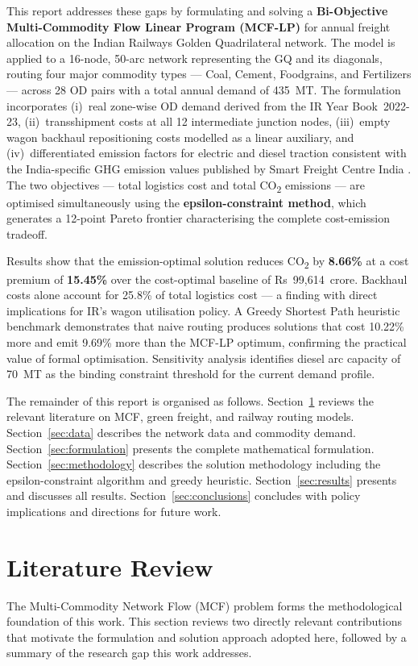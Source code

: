 \documentclass[11pt, a4paper]{article}
\numberwithin{equation}{section}
\numberwithin{figure}{section}
\numberwithin{table}{section}
\begin{document}
This report addresses these gaps by formulating and solving a \textbf{Bi-Objective
Multi-Commodity Flow Linear Program (MCF-LP)} for annual freight allocation on the
Indian Railways Golden Quadrilateral network. The model is applied to a 16-node,
50-arc network representing the GQ and its diagonals, routing four major commodity
types — Coal, Cement, Foodgrains, and Fertilizers — across 28 OD pairs with a total
annual demand of 435~MT. The formulation incorporates (i)~real zone-wise OD demand
derived from the IR Year Book~2022-23, (ii)~transshipment costs at all 12 intermediate
junction nodes, (iii)~empty wagon backhaul repositioning costs modelled as a linear
auxiliary, and (iv)~differentiated emission factors for electric and diesel traction
consistent with the India-specific GHG emission values published by Smart Freight Centre
India \cite{sfcindia2025}. The two objectives — total logistics cost and total
CO\textsubscript{2} emissions — are optimised simultaneously using the
\textbf{epsilon-constraint method}, which generates a 12-point Pareto frontier
characterising the complete cost-emission tradeoff.

Results show that the emission-optimal solution reduces CO\textsubscript{2} by
\textbf{8.66\%} at a cost premium of \textbf{15.45\%} over the cost-optimal baseline of
Rs~99,614~crore. Backhaul costs alone account for 25.8\% of total logistics cost — a
finding with direct implications for IR's wagon utilisation policy. A Greedy Shortest
Path heuristic benchmark demonstrates that naive routing produces solutions that cost 10.22\% more and emit
9.69\% more than the MCF-LP optimum, confirming the practical value of formal
optimisation. Sensitivity analysis identifies diesel arc capacity of 70~MT as the binding constraint threshold for the current demand profile.

The remainder of this report is organised as follows. Section~\ref{sec:litrev} reviews
the relevant literature on MCF, green freight, and railway routing models.
Section~\ref{sec:data} describes the network data and commodity demand.
Section~\ref{sec:formulation} presents the complete mathematical formulation.
Section~\ref{sec:methodology} describes the solution methodology including the
epsilon-constraint algorithm and greedy heuristic.
Section~\ref{sec:results} presents and discusses all results.
Section~\ref{sec:conclusions} concludes with policy implications and directions for
future work.

\section{Literature Review}
\label{sec:litrev}
The Multi-Commodity Network Flow (MCF) problem forms the methodological foundation of
this work. This section reviews two directly relevant contributions that motivate the
formulation and solution approach adopted here, followed by a summary of the research
gap this work addresses.
\end{document}
